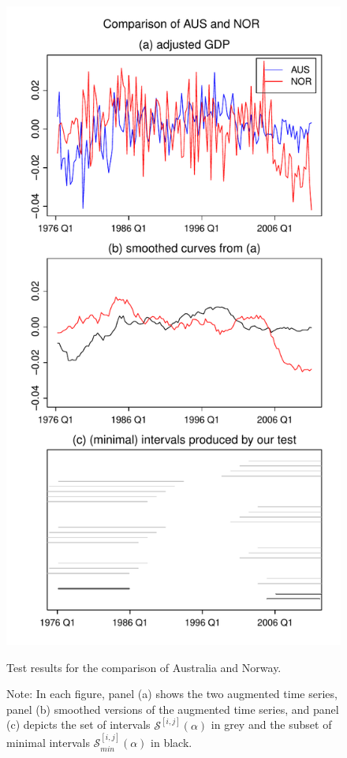 \documentclass[a4paper,12pt]{article}
\begin{document}
{\begin{figure}[p!]
\begin{minipage}[t]{0.49\textwidth}
\includegraphics[width=\textwidth]{plots/AUS_vs_NOR}
\caption{Test results for the comparison of Australia and Norway.}\label{fig:Australia:Norway}
\end{minipage}
\caption*{Note: In each figure, panel (a) shows the two augmented time series, panel (b) smoothed versions of the augmented time series, and panel (c) depicts the set of intervals $\mathcal{S}^{[i,j]}(\alpha)$ in grey and the subset of minimal intervals $\mathcal{S}^{[i,j]}_{min}(\alpha)$ in black.}
\end{figure}


}
\end{document}
